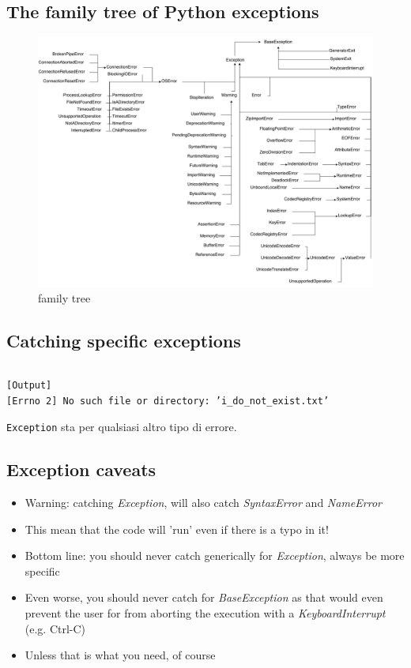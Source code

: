 \subsection{The family tree of Python exceptions}

\begin{figure}[ht]
    \centering
    \includegraphics[width=1\textwidth]{lez7/error_tree.png}
    \caption{family tree}
    \label{error_tree}
\end{figure}
\FloatBarrier


\subsection{Catching specific exceptions}

\inputminted{python}{snippets/try_block.py}
\begin{verbatim}
[Output]
[Errno 2] No such file or directory: ’i_do_not_exist.txt’
\end{verbatim}

\texttt{Exception} sta per qualsiasi altro tipo di errore.


\subsection{Exception caveats}
  \begin{itemize}
    \item Warning: catching \emph{Exception}, will also catch \emph{SyntaxError}
          and \emph{NameError}
    \medskip
    \item This mean that the code will 'run' even if there is a typo in it!
    \medskip
    \item Bottom line: \alert{you should never catch generically for \emph{Exception}},
          always be more specific
    \medskip
    \item Even worse, you should never catch for \emph{BaseException} as
          that would even prevent the user for from aborting the execution with a
          \emph{KeyboardInterrupt} (e.g. Ctrl-C)
    \medskip
    \item Unless that is what you need, of course
  \end{itemize}
  
